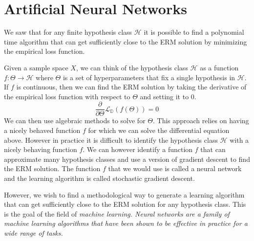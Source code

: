 \section{Artificial Neural Networks}
We saw that for any
finite hypothesis class $\mathcal{H}$ it is possible to find a polynomial time 
algorithm that can get sufficiently close to the ERM solution by 
minimizing the empirical loss function.

Given a sample space $X$,
we can think of the hypothesis class $\mathcal{H}$ as
a function $f:\Theta\to\mathcal{H}$
where $\Theta$ is a set of hyperparameters 
that fix a single hypothesis in $\mathcal{H}$.
If $f$ is continuous, then we can find the ERM solution by
taking the derivative of the empirical loss function with respect to $\Theta$ and setting it to $0$.
\[
    \frac{\partial}{\partial\Theta}\mathcal{L}_{\mathbb{D}}(f(\Theta))=0    
\]
We can then use algebraic methods to solve for $\Theta$. 
This approach relies on having a nicely behaved function $f$ for which we can solve
the differential equation above.
However in practice it is difficult to identify the hypothesis class $\mathcal{H}$ 
with a nicely behaving function $f$.
We can however identify a function $f$ that can approximate many hypothesis classes
and use a version of gradient descent to find the ERM solution.
The function $f$ that we would use is called a neural network and the learning
algorithm is called stochastic gradient descent.

However, we wish to find a methodological way to generate a learning algorithm
that can get sufficiently close to the ERM solution for any hypothesis class.
This is the goal of the field of \it{machine learning}.
Neural networks are a family of machine learning algorithms that have been shown to be
effective in practice for a wide range of tasks. 
